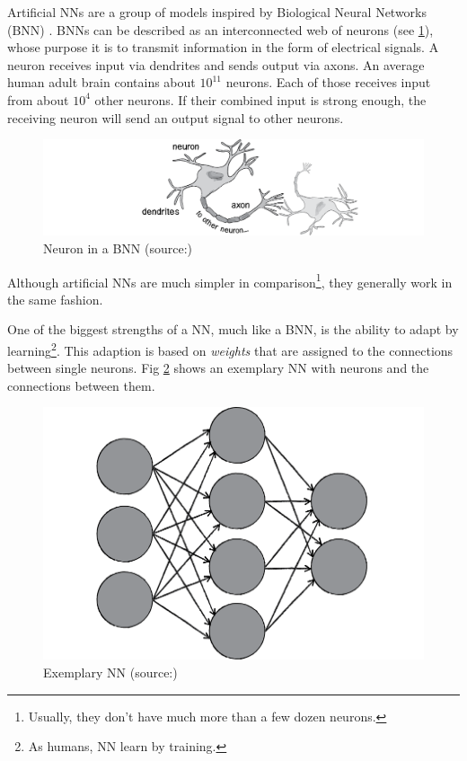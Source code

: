 Artificial NNs are a group of models inspired by Biological Neural Networks (BNN) . BNNs can be described as an interconnected web of neurons (see \ref{fig2_bnn}), whose purpose it is to transmit information in the form of electrical signals. A neuron receives input via dendrites and sends output via axons\cite{Shiffman12}. An average human adult brain contains about $10^{11}$ neurons. Each of those receives input from about $10^4$ other neurons. If their combined input is strong enough, the receiving neuron will send an output signal to other neurons\cite{Bourg04}.

\begin{figure}[H]
	\begin{center}
		\includegraphics[scale=0.7]{img/bnn.png}
		\caption{Neuron in a BNN (source:\cite{Shiffman12})}
		\label{fig2_bnn}
	\end{center}
\end{figure}

Although artificial NNs are much simpler in comparison\footnote{Usually, they don't have much more than a few dozen neurons\cite{Bourg04}.}, they generally work in the same fashion.

One of the biggest strengths of a NN, much like a BNN, is the ability to adapt by learning\footnote{As humans, NN learn by training\cite{Shiffman12}.}. This adaption is based on \emph{weights} that are assigned to the connections between single neurons. Fig \ref{fig2_nn} shows an exemplary NN with neurons and the connections between them.

\begin{figure}[H]
	\begin{center}
		\includegraphics[scale=1.0]{img/NN.png}
		\caption{Exemplary NN (source:\cite{Shiffman12})}
		\label{fig2_nn}
	\end{center}
\end{figure}

